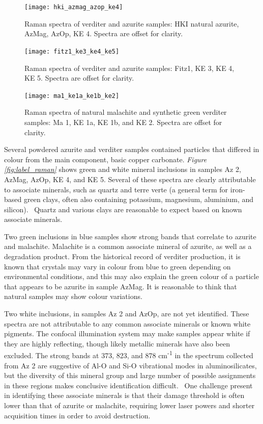\begin{figure}[H]
  \centering
  \texttt{[image: hki\_azmag\_azop\_ke4]}
\caption[Raman spectra of blue samples.]{Raman spectra of verditer and azurite samples: HKI natural azurite, AzMag, AzOp, KE 4. Spectra are offset for clarity.}
\label{fig:blue_comparison2}
\end{figure}

\begin{figure}[H]
  \centering
  \texttt{[image: fitz1\_ke3\_ke4\_ke5]}
\caption[Raman spectra of blue samples.]{Raman spectra of verditer and azurite samples: Fitz1, KE 3, KE 4, KE 5. Spectra are offset for clarity.}
\label{fig:blue_comparison3}
\end{figure}

\begin{figure}[H]
\centering
  \texttt{[image: ma1\_ke1a\_ke1b\_ke2]}
\caption[Raman spectra of green samples.]{Raman spectra of natural malachite and synthetic green verditer samples: Ma 1, KE 1a, KE 1b, and KE 2. Spectra are offset for clarity.}
\label{fig:green_comparison}
\end{figure}

Several powdered azurite and verditer samples contained particles that differed in colour from the main component, basic copper carbonate. \textit{Figure \ref{fig:label_raman}} shows green and white mineral inclusions in samples Az 2, AzMag, AzOp, KE 4, and KE 5. Several of these spectra are clearly attributable to associate minerals, such as quartz and terre verte (a general term for iron-based green clays, often also containing potassium, magnesium, aluminium, and silicon).~\autocite{ucl_database,cameo_mfa,irug_quartz} Quartz and various clays are reasonable to expect based on known associate minerals.

Two green inclusions in blue samples show strong bands that correlate to azurite and malachite. Malachite is a common associate mineral of azurite, as well as a degradation product. From the historical record of verditer production, it is known that crystals may vary in colour from blue to green depending on environmental conditions, and this may also explain the green colour of a particle that appears to be azurite in sample AzMag. It is reasonable to think that natural samples may show colour variations. 

Two white inclusions, in samples Az 2 and AzOp, are not yet identified. These spectra are not attributable to any common associate minerals or known white pigments. The confocal illumination system may make samples appear white if they are highly reflecting, though likely metallic minerals have also been excluded. The strong bands at 373, 823, and 878 cm\textsuperscript{-1} in the spectrum collected from Az 2 are suggestive of Al-O and Si-O vibrational modes in aluminosilicates, but the diversity of this mineral group and large number of possible assignments in these regions makes conclusive identification difficult.~\autocite{Culka} One challenge present in identifying these associate minerals is that their damage threshold is often lower than that of azurite or malachite, requiring lower laser powers and shorter acquisition times in order to avoid destruction.

